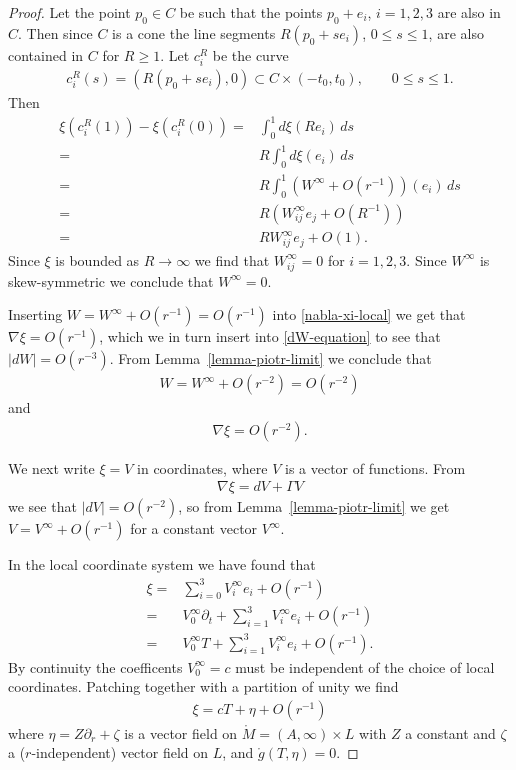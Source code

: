 \documentclass[a4paper,11pt,reqno]{amsart}
\theoremstyle{plain}
\newcommand{\Mring}{\mathring{M}}
\newcommand{\gring}{\mathring{g}}
\numberwithin{equation}{section}
\begin{document}
\begin{proof}
Let the point $p_0 \in C$ be such that the points $p_0 + e_i$, $i=1,2,3$ are also in $C$. Then since $C$ is a cone the line segments $R(p_0 + s e_i)$, $0 \leq s \leq 1$, are also contained in $C$ for $R \geq 1$. Let $c_i^R$ be the curve 
\begin{align}
c_i^R(s) = (R(p_0 + s e_i),0 ) \subset C \times (-t_0,t_0), \qquad 0\leq s \leq 1.
\end{align} 
Then 
\begin{align} 
\xi(c_i^R(1)) - \xi(c_i^R(0)) 
={}& \int_0^1 d\xi(R e_i) \, ds \nonumber\\
={}& R\int_0^1 d\xi(e_i) \, ds \nonumber \\
={}& R\int_0^1 \left( W^\infty + O(r^{-1}) \right)(e_i) \, ds \nonumber \\
={}& R (W^\infty_{ij} e_j + O(R^{-1})) \nonumber \\
={}& R W^\infty_{ij} e_j + O(1).
\end{align} 
Since $\xi$ is bounded as $R \to \infty$ we find that $W^\infty_{ij} = 0$ for $i=1,2,3$. Since $W^\infty$ is skew-symmetric we conclude that $W^\infty = 0$. 

Inserting $W = W^\infty + O(r^{-1}) = O(r^{-1})$ into \eqref{nabla-xi-local} we get that $\nabla \xi = O(r^{-1})$, which we in turn insert into \eqref{dW-equation} to see that $|dW| = O(r^{-3})$. From Lemma~\ref{lemma-piotr-limit} we conclude that 
\begin{align}
W = W^\infty + O(r^{-2}) = O(r^{-2})
\end{align}
and 
\begin{align}
\nabla \xi = O(r^{-2}).
\end{align} 

We next write $\xi = V$ in coordinates, where $V$ is a vector of functions. From 
\begin{align} 
\nabla \xi = dV + \Gamma V  
\end{align} 
we see that $|dV| = O(r^{-2})$, so from Lemma~\ref{lemma-piotr-limit} we get $V = V^\infty + O(r^{-1})$ for a constant vector $V^\infty$. 

In the local coordinate system we have found that
\begin{align}\label{eq:nablaxiO} 
\xi ={}&  \sum_{i=0}^3 V^\infty_i e_i + O(r^{-1}) \nonumber \\
={}&  V^\infty_0 \partial_t + \sum_{i=1}^3 V^\infty_i e_i + O(r^{-1}) \nonumber \\
={}&  V^\infty_0 T + \sum_{i=1}^3 V^\infty_i e_i + O(r^{-1}).
\end{align} 
By continuity the coefficents $V^\infty_0 = c$ must be independent of the choice of local coordinates. Patching together with a partition of unity we find
\begin{align} 
\xi = cT + \eta + O(r^{-1})
\end{align} 
where $\eta = Z \partial_r + \zeta$ is a vector field on $\Mring = (A,\infty)\times L$ with $Z$ a constant and $\zeta$ a ($r$-independent) vector field on $L$, and $\gring(T,\eta) = 0$. 


\end{proof}
\end{document}
